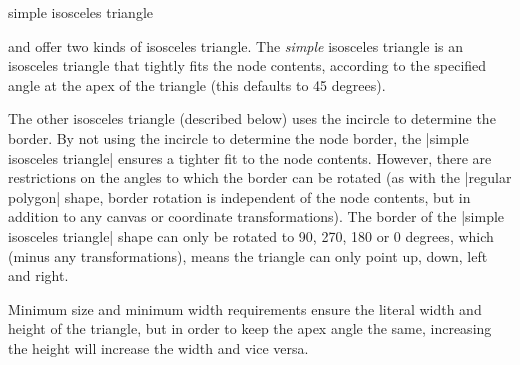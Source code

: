 \begin{shape}{simple isosceles triangle}

	\pgfname{} and \tikzname{} offer two kinds of isosceles triangle. 
	The \emph{simple} isosceles triangle is an isosceles triangle 
	that tightly fits the node contents, according to the specified 
	angle at the apex of the triangle (this defaults to 45 degrees). 

\begin{codeexample}[]
\end{codeexample}	

	The other isosceles triangle (described below) uses the incircle to 
	determine the border. By not using the incircle to determine the node 
	border, the |simple isosceles triangle| ensures a tighter fit to the 
	node contents. However, there are restrictions on the angles to which
	the border can be rotated (as with the |regular polygon| shape, border 
	rotation is independent of the node contents, but in addition to any 
	canvas or coordinate transformations). 
	The border of the |simple isosceles triangle| shape can only be rotated 
	to 90, 270, 180 or 0 degrees, which (minus any transformations), means
	the triangle can only point up, down, left and right. 

\begin{codeexample}[]
\end{codeexample}

	Minimum size and minimum width requirements ensure the literal 
	width and height of the triangle, but in order to keep the apex 
	angle the same, increasing the height will increase the width 
	and vice versa. 
   

\end{shape}
